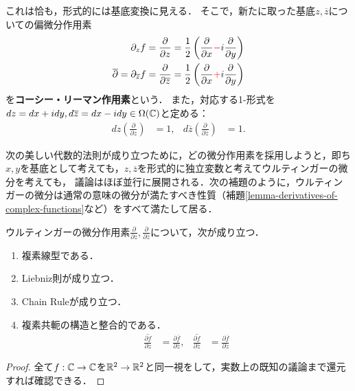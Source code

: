 \documentclass[uplatex, dvipdfmx]{jsreport}
\begin{document}
\begin{definition}\label{def-CR-operator}
    これは恰も，形式的には基底変換に見える．
    そこで，新たに取った基底$z,\overline{z}$についての偏微分作用素
    \begin{align*}
        \partial_zf&=\frac{\partial}{\partial z}=\frac{1}{2}\left(\frac{\partial}{\partial x}\textcolor{red}{-}i\frac{\partial}{\partial y}\right)\\
        \overline{\partial}=\partial_{\overline{z}}f&=\frac{\partial}{\partial\overline{z}}=\frac{1}{2}\left(\frac{\partial}{\partial x}\textcolor{red}{+}i\frac{\partial}{\partial y}\right)
    \end{align*}
    を\textbf{コーシー・リーマン作用素}という．
    また，対応する1-形式を$dz=dx+idy,d\overline{z}=dx-idy\in\Omega(\mathbb{C})$と定める：
    \begin{align*}
        dz\left(\frac{\partial}{\partial z}\right)&=1, &d\overline{z}\left(\frac{\partial}{\partial\overline{z}}\right)&=1.
    \end{align*}
\end{definition}

次の美しい代数的法則が成り立つために，どの微分作用素を採用しようと，即ち$x,y$を基底として考えても，$z,\overline{z}$を形式的に独立変数と考えてウルティンガーの微分を考えても，
議論はほぼ並行に展開される．次の補題のように，ウルティンガーの微分は通常の意味の微分が満たすべき性質（補題\ref{lemma-derivatives-of-complex-functions}など）をすべて満たして居る．
\begin{lemma}[微分法則]
    ウルティンガーの微分作用素$\frac{\partial}{\partial z},\frac{\partial}{\partial\overline{z}}$について，次が成り立つ．
    \begin{enumerate}
        \item 複素線型である．
        \item Liebniz則が成り立つ．
        \item Chain Ruleが成り立つ．
        \item 複素共軛の構造と整合的である．
        \begin{align*}
            \overline{\frac{\partial f}{\partial z}}&=\frac{\partial \overline{f}}{\partial\overline{z}},&\overline{\frac{\partial f}{\partial \overline{z}}}&=\frac{\partial \overline{f}}{\partial z}
        \end{align*}
    \end{enumerate}
\end{lemma}
\begin{proof}
    全て$f:\mathbb{C}\to\mathbb{C}$を$\mathbb{R}^2\to\mathbb{R}^2$と同一視をして，実数上の既知の議論まで還元すれば確認できる．
\end{proof}
\end{document}
